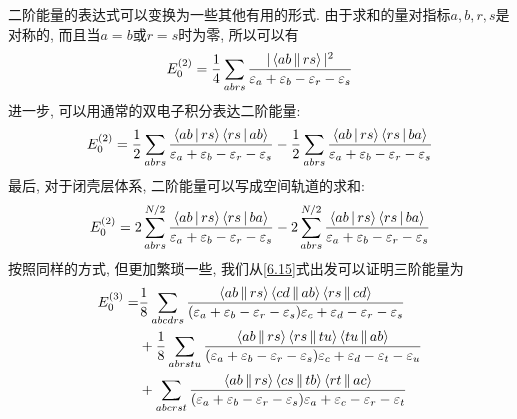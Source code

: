二阶能量的表达式可以变换为一些其他有用的形式. 
由于求和的量对指标$a,b, r,s$是对称的, 
而且当$a=b$或$r=s$时为零, 
所以可以有
\begin{align}
E_0^{(2)} = \frac{1}{4} \sum_{abrs}\frac{|\Braket{ab||rs}|^2}{\varepsilon_a + \varepsilon_b -\varepsilon_r-\varepsilon_s}
\label{6.72}
\end{align}
进一步, 
可以用通常的双电子积分表达二阶能量:
\begin{align}
E_0^{(2)} = \frac{1}{2}\sum_{abrs}\frac{\Braket{ab|rs}\Braket{rs|ab}}{\varepsilon_a + \varepsilon_b -\varepsilon_r-\varepsilon_s}-\frac{1}{2}\sum_{abrs}\frac{\Braket{ab|rs}\Braket{rs|ba}}{\varepsilon_a + \varepsilon_b -\varepsilon_r-\varepsilon_s}
\label{6.73}
\end{align}
最后, 
对于闭壳层体系, 
二阶能量可以写成空间轨道的求和:
\begin{align}
E_0^{(2)} = 2\sum_{abrs}^{N/2}\frac{\Braket{ab|rs}\Braket{rs|ba}}{\varepsilon_a + \varepsilon_b -\varepsilon_r-\varepsilon_s}-2\sum_{abrs}^{N/2}\frac{\Braket{ab|rs}\Braket{rs|ba}}{\varepsilon_a + \varepsilon_b -\varepsilon_r-\varepsilon_s}
\label{6.74}
\end{align}
按照同样的方式, 
但更加繁琐一些, 
我们从\eqref{6.15}式出发可以证明三阶能量为
\begin{align}
E_0^{(3)} = & \frac{1}{8} \sum_{abcdrs} \frac{\Braket{ab||rs}\Braket{cd||ab}\Braket{rs||cd}}{(\varepsilon_a + \varepsilon_b -\varepsilon_r-\varepsilon_s){\varepsilon_c + \varepsilon_d -\varepsilon_r-\varepsilon_s}} \notag\\
          & + \frac{1}{8}\sum_{abrstu}\frac{\Braket{ab||rs}\Braket{rs||tu}\Braket{tu||ab}}{(\varepsilon_a + \varepsilon_b -\varepsilon_r-\varepsilon_s){\varepsilon_c + \varepsilon_d -\varepsilon_t-\varepsilon_u}} \notag\\
          & + \sum_{abcrst}\frac{\Braket{ab||rs}\Braket{cs||tb}\Braket{rt||ac}}{(\varepsilon_a + \varepsilon_b -\varepsilon_r-\varepsilon_s){\varepsilon_a + \varepsilon_c -\varepsilon_r-\varepsilon_t}}
          \label{6.75}
\end{align}

